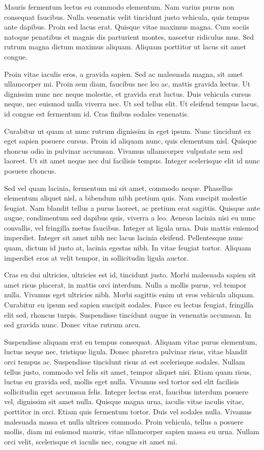 Mauris fermentum lectus eu commodo elementum. Nam varius purus non consequat faucibus. Nulla venenatis velit tincidunt justo vehicula, quis tempus ante dapibus. Proin sed lacus erat. Quisque vitae maximus magna. Cum sociis natoque penatibus et magnis dis parturient montes, nascetur ridiculus mus. Sed rutrum magna dictum maximus aliquam. Aliquam porttitor ut lacus sit amet congue.

Proin vitae iaculis eros, a gravida sapien. Sed ac malesuada magna, sit amet ullamcorper mi. Proin sem diam, faucibus nec leo ac, mattis gravida lectus. Ut dignissim nunc nec neque molestie, et gravida erat luctus. Duis vehicula cursus neque, nec euismod nulla viverra nec. Ut sed tellus elit. Ut eleifend tempus lacus, id congue est fermentum id. Cras finibus sodales venenatis.

Curabitur ut quam at nunc rutrum dignissim in eget ipsum. Nunc tincidunt ex eget sapien posuere cursus. Proin id aliquam nunc, quis elementum nisl. Quisque rhoncus odio in pulvinar accumsan. Vivamus ullamcorper vulputate sem sed laoreet. Ut sit amet neque nec dui facilisis tempus. Integer scelerisque elit id nunc posuere rhoncus.

Sed vel quam lacinia, fermentum mi sit amet, commodo neque. Phasellus elementum aliquet nisl, a bibendum nibh pretium quis. Nam suscipit molestie feugiat. Nam blandit tellus a purus laoreet, ac pretium erat sagittis. Quisque ante augue, condimentum sed dapibus quis, viverra a leo. Aenean lacinia nisi eu nunc convallis, vel fringilla metus faucibus. Integer at ligula urna. Duis mattis euismod imperdiet. Integer sit amet nibh nec lacus lacinia eleifend. Pellentesque nunc quam, dictum id justo at, lacinia egestas nibh. In vitae feugiat tortor. Aliquam imperdiet eros at velit tempor, in sollicitudin ligula auctor.

Cras eu dui ultricies, ultricies est id, tincidunt justo. Morbi malesuada sapien sit amet risus placerat, in mattis orci interdum. Nulla a mollis purus, vel tempor nulla. Vivamus eget ultricies nibh. Morbi sagittis enim ut eros vehicula aliquam. Curabitur eu ipsum sed sapien suscipit sodales. Fusce eu lectus feugiat, fringilla elit sed, rhoncus turpis. Suspendisse tincidunt augue in venenatis accumsan. In sed gravida nunc. Donec vitae rutrum arcu.

Suspendisse aliquam erat eu tempus consequat. Aliquam vitae purus elementum, luctus neque nec, tristique ligula. Donec pharetra pulvinar risus, vitae blandit orci tempus ac. Suspendisse tincidunt risus at est scelerisque sodales. Nullam tellus justo, commodo vel felis sit amet, tempor aliquet nisi. Etiam quam risus, luctus eu gravida sed, mollis eget nulla. Vivamus sed tortor sed elit facilisis sollicitudin eget accumsan felis. Integer lectus erat, faucibus interdum posuere vel, dignissim sit amet nulla. Quisque magna urna, iaculis vitae iaculis vitae, porttitor in orci. Etiam quis fermentum tortor. Duis vel sodales nulla. Vivamus malesuada massa et nulla ultrices commodo. Proin vehicula, tellus a posuere mollis, diam mi euismod mauris, vitae ullamcorper sapien massa eu urna. Nullam orci velit, scelerisque et iaculis nec, congue sit amet mi.

